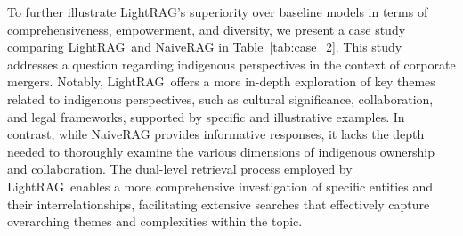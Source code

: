 \documentclass{article} %
\def\model{LightRAG}
\begin{document}
To further illustrate \model's superiority over baseline models in terms of comprehensiveness, empowerment, and diversity, we present a case study comparing \model\ and NaiveRAG in Table~\ref{tab:case_2}. This study addresses a question regarding indigenous perspectives in the context of corporate mergers. Notably, \model\ offers a more in-depth exploration of key themes related to indigenous perspectives, such as cultural significance, collaboration, and legal frameworks, supported by specific and illustrative examples. In contrast, while NaiveRAG provides informative responses, it lacks the depth needed to thoroughly examine the various dimensions of indigenous ownership and collaboration. The dual-level retrieval process employed by \model\ enables a more comprehensive investigation of specific entities and their interrelationships, facilitating extensive searches that effectively capture overarching themes and complexities within the topic.
\end{document}
